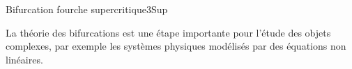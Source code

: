 \begin{exercise}{Bifurcation fourche supercritique}{3}{Sup}
\begin{questions}

\end{questions}
 \plusloin La théorie des bifurcations est une étape importante pour l'étude des objets complexes, par exemple les systèmes physiques modélisés par des équations non linéaires.
    


\end{exercise}